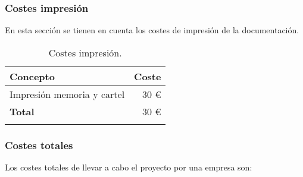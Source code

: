 \subsubsection{Costes impresión}

En esta sección se tienen en cuenta los costes de impresión de la documentación.

\begin{longtable}[]{@{}lr@{}}
\toprule
\begin{minipage}[b]{0.38\columnwidth}\raggedright\strut
\textbf{Concepto}\strut
\end{minipage} & \begin{minipage}[b]{0.20\columnwidth}\raggedright\strut
\textbf{Coste}\strut
\end{minipage}\tabularnewline
\midrule
\endhead

\begin{minipage}[t]{0.38\columnwidth}\raggedright\strut
Impresión memoria y cartel\strut
\end{minipage} & \begin{minipage}[t]{0.20\columnwidth}\raggedright\strut
30 \euro{}\strut
\end{minipage}\tabularnewline

\midrule

\begin{minipage}[t]{0.38\columnwidth}\raggedright\strut
\textbf{Total}\strut
\end{minipage} & \begin{minipage}[t]{0.20\columnwidth}\raggedright\strut
30 \euro{}\strut
\end{minipage}\tabularnewline
\bottomrule
\caption{Costes impresión.}
\end{longtable}

\subsubsection{Costes totales}

Los costes totales de llevar a cabo el proyecto por una empresa son:

